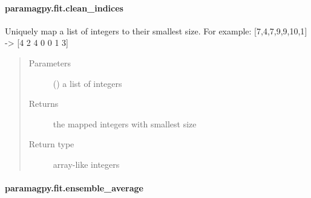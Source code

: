 \documentclass[a4paper,10pt,english,openany,oneside]{sphinxmanual}
\begin{document}
\paragraph{paramagpy.fit.clean\_indices}
\label{\detokenize{reference/generated/paramagpy.fit.clean_indices:paramagpy-fit-clean-indices}}\label{\detokenize{reference/generated/paramagpy.fit.clean_indices::doc}}

\begin{fulllineitems}
\label{\detokenize{reference/generated/paramagpy.fit.clean_indices:paramagpy.fit.clean_indices}}
Uniquely map a list of integers to their smallest size.
For example: {[}7,4,7,9,9,10,1{]} -\textgreater{} {[}4 2 4 0 0 1 3{]}
\begin{quote}\begin{description}
\item[{Parameters}] \leavevmode
{} () \textendash{} a list of integers

\item[{Returns}] \leavevmode
{} \textendash{} the mapped integers with smallest size

\item[{Return type}] \leavevmode
array-like integers

\end{description}\end{quote}

\end{fulllineitems}



\paragraph{paramagpy.fit.ensemble\_average}
\label{\detokenize{reference/generated/paramagpy.fit.ensemble_average:paramagpy-fit-ensemble-average}}\label{\detokenize{reference/generated/paramagpy.fit.ensemble_average::doc}}

\begin{fulllineitems}
\label{\detokenize{reference/generated/paramagpy.fit.ensemble_average:paramagpy.fit.ensemble_average}}
\end{fulllineitems}
\end{document}

